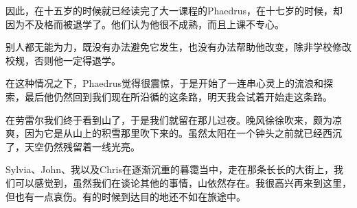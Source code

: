 \documentclass[UTF8]{article}
\begin{document}
\par 因此，在十五岁的时候就已经读完了大一课程的Phaedrus，在十七岁的时候，却因为不及格而被退学了。他们认为他很不成熟，而且上课不专心。
\par 别人都无能为力，既没有办法避免它发生，也没有办法帮助他改变，除非学校修改校规，否则他一定得退学。
\par 在这种情况之下，Phaedrus觉得很震惊，于是开始了一连串心灵上的流浪和探索，最后他仍然回到我们现在所沿循的这条路，明天我会试着开始走这条路。
\par 在劳雷尔我们终于看到山了，于是我们就留在那儿过夜。晚风徐徐吹来，颇为凉爽，因为它是从山上的积雪那里吹下来的。虽然太阳在一个钟头之前就已经西沉了，天空仍然残留着一线光亮。
\par Sylvia、John、我以及Chris在逐渐沉重的暮霭当中，走在那条长长的大街上，我们可以感觉到，虽然我们在谈论其他的事情，山依然存在。我很高兴再来到这里，但也有一点哀伤。有的时候到达目的地还不如在旅途中。
\end{document}
